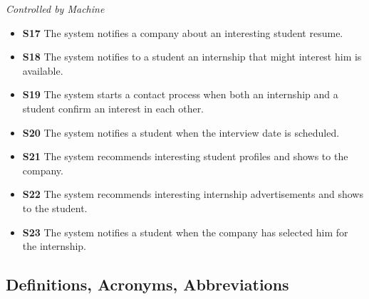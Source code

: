 \documentclass{article}
\begin{document}
    \textit{Controlled by Machine}
    \begin{itemize}
        \item \textbf{S17} The system notifies a company about an interesting student resume.
        \item \textbf{S18} The system notifies to a student an internship that might interest him is available.
        \item \textbf{S19} The system starts a contact process when both an internship and a student confirm an interest in each other.
        \item \textbf{S20} The system notifies a student when the interview date is scheduled.
        \item \textbf{S21} The system recommends interesting student profiles and shows to the company.
        \item \textbf{S22} The system recommends interesting internship advertisements and shows to the student.
        \item \textbf{S23} The system notifies a student when the company has selected him for the internship.
    \end{itemize}
\subsection{Definitions, Acronyms, Abbreviations}
\end{document}
